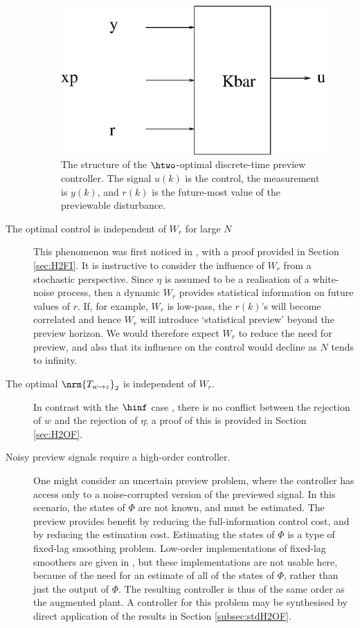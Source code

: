 \begin{description}
{
\stdcontrolfrags
{}
\begin{figure}
\begin{center}
\includegraphics[width=0.5\columnwidth]{./diags/PrevContStructxpKbar.eps}
\caption{\label{fig:PrevContStructxp} The structure of the $\htwo$-optimal discrete-time preview controller. The signal $u(k)$ is the control, the measurement is $y(k)$, and $r(k)$ is the future-most value of the previewable disturbance.}
\end{center}
\end{figure}}
\item[The optimal control is independent of $W_r$ for large $N$]
This phenomenon was first noticed in \cite{Tomizuka_1975_OptDiscretePreview}, with a proof provided in Section \ref{sec:H2FI}. It is instructive to consider the influence of $W_r$ from a stochastic perspective. Since $\eta$ is assumed to be a realisation of a white-noise process, then a dynamic $W_r$ provides statistical information on future values of $r$. If, for example, $W_r$ is low-pass, the $r(k)$'s will become correlated and hence $W_r$ will introduce `statistical preview' beyond the preview horizon. We would therefore expect $W_r$ to reduce the need for preview, and also that its influence on the control would decline as $N$ tends to infinity.
\item[The optimal $\nrm{T_{w\rightarrow z}}_2$ is independent of $W_r$.]
In contrast with the $\hinf$ case \cite{Hazell_2007_DiscreteHinfPreview}, there is no conflict between the rejection of $w$ and the rejection of $\eta$; a proof of this is provided in Section \ref{sec:H2OF}.
\item[Noisy preview signals require a high-order controller.]
One might consider an uncertain preview problem, where the controller has access only to a noise-corrupted version of the previewed signal. 
In this scenario, the states of $\Phi$ are not known, and must be estimated. The preview provides benefit by reducing the full-information control cost, and by reducing the estimation cost. Estimating the states of $\Phi$ is a type of fixed-lag smoothing problem. Low-order implementations of fixed-lag smoothers are given in \cite{Anderson_1979_OptimalFiltering}, but these implementations are not usable here, because of the need for an estimate of all of the states of $\Phi$, rather than just the output of $\Phi$. The resulting controller is thus of the same order as the augmented plant. A controller for this problem may be synthesised by direct application of the results in Section \ref{subsec:stdH2OF}.
\end{description}

